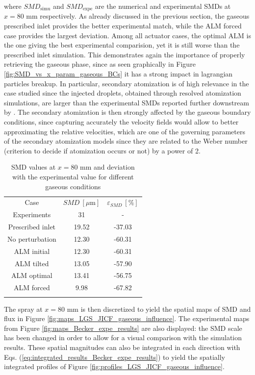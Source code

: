 where $SMD_\mathrm{simu}$ and $SMD_\mathrm{expe}$ are the numerical and experimental SMDs at $x = 80$ mm respectively. As already discussed in the previous section, the gaseous prescribed inlet provides the better experimental match, while the ALM forced case provides the largest deviation. Among all actuator cases, the optimal ALM is the one giving the best experimental comparision, yet it is still worse than the prescribed inlet simulation. This demonstrates again the importance of properly retrieving the gaseous phase, since as seen graphically in Figure \ref{fig:SMD_vs_x_param_gaseous_BCs} it has a strong impact in lagrangian particles breakup. In particular, secondary atomization is of high relevance in the case studied since the injected droplets, obtained through resolved atomization simulations, are larger than the experimental SMDs reported further downstream by . The secondary atomization is then strongly affected by the gaseous boundary conditions, since capturing accurately the velocity fields would allow to better approximating the relative velocities, which are one of the governing parameters of the secondary atomization models since they are related to the Weber number (criterion to decide if atomization occurs or not) by a power of 2.

\clearpage

\begin{table}[!h]
\centering
\caption{SMD values at $x = 80$ mm and deviation with the experimental value for different gaseous conditions}
\begin{tabular}{ccc}
\thickhline
Case & $SMD~\left[\mu \mathrm{m} \right]$ & $\varepsilon_{SMD}~\left[\% \right]$ \\
\thickhline
Experiments & 31 & - \\
Prescribed inlet & 19.52 & -37.03 \\
No perturbation & 12.30 & -60.31 \\
ALM initial & 12.30 & -60.31 \\
ALM tilted & 13.05 & -57.90 \\
ALM optimal & 13.41 & -56.75 \\
ALM forced & 9.98 & -67.82 \\
\thickhline
\end{tabular}
\label{tab:SMD_deviations_gaseous_inlet}
\end{table}

The spray at $x = 80$ mm is then discretized to yield the spatial maps of SMD and flux in Figure \ref{fig:maps_LGS_JICF_gaseous_influence}. The experimental maps from Figure \ref{fig:maps_Becker_expe_results} are also displayed: the SMD scale has been changed in order to allow for a visual comparison with the simulation results. These spatial magnitudes can also be integrated in each direction with Eqs. (\ref{eq:integrated_results_Becker_expe_results}) to yield the spatially integrated profiles of Figure \ref{fig:profiles_LGS_JICF_gaseous_influence}.

